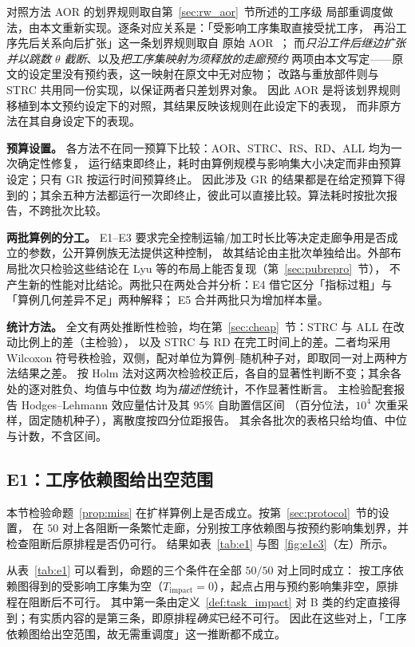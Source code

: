 \documentclass[manuscript,screen,review]{acmart}
\providecommand{\STRC}{\textsc{STRC}}
\newcommand{\NPairs}{50}
\newcommand{\PassMiss}{\NPairs/\NPairs}      %
\begin{document}
对照方法 AOR 的划界规则取自第~\ref{sec:rw_aor}~节所述的工序级
局部重调度做法，由本文重新实现。逐条对应关系是：「受影响工序集取直接受扰工序，
再沿工序先后关系向后扩张」这一条划界规则取自
原始 AOR~\cite{subramaniam2003maor}；
而\emph{只沿工件后继边扩张并以跳数 \(\theta\) 截断}、以及\emph{把工序集映射为须释放的走廊预约}
两项由本文写定——原文的设定里没有预约表，这一映射在原文中无对应物；
改路与重放部件则与 \STRC{} 共用同一份实现，以保证两者只差划界对象。
因此 AOR 是将该划界规则移植到本文预约设定下的对照，其结果反映该规则在此设定下的表现，
而非原方法在其自身设定下的表现。

\textbf{预算设置。}
各方法不在同一预算下比较：AOR、\STRC{}、RS、RD、ALL 均为一次确定性修复，
运行结束即终止，耗时由算例规模与影响集大小决定而非由预算设定；只有 GR 按运行时间预算终止。
因此涉及 GR 的结果都是在给定预算下得到的；其余五种方法都运行一次即终止，彼此可以直接比较。算法耗时按批次报告，不跨批次比较。

\textbf{两批算例的分工。}
E1--E3 要求完全控制运输/加工时长比等决定走廊争用是否成立的参数，公开算例族无法提供这种控制，
故其结论由主批次单独给出。外部布局批次只检验这些结论在 Lyu 等的布局上能否复现（第~\ref{sec:pubrepro}~节），
不产生新的性能对比结论。两批只在两处合并分析：E4 借它区分「指标过粗」与「算例几何差异不足」两种解释；
E5 合并两批只为增加样本量。

\textbf{统计方法。}
全文有两处推断性检验，均在第~\ref{sec:cheap}~节：\STRC{} 与 ALL 在改动比例上的差（主检验），
以及 \STRC{} 与 RD 在完工时间上的差。二者均采用 Wilcoxon 符号秩检验，双侧，配对单位为算例--随机种子对，即取同一对上两种方法结果之差。
按 Holm 法对这两次检验校正后，各自的显著性判断不变；其余各处的逐对胜负、均值与中位数
均为\emph{描述性}统计，不作显著性断言。
主检验配套报告 Hodges--Lehmann 效应量估计及其 \(95\%\) 自助置信区间
（百分位法，\(10^4\) 次重采样，固定随机种子），离散度按四分位距报告。
其余各批次的表格只给均值、中位与计数，不含区间。

\subsection{E1：工序依赖图给出空范围}
\label{sec:e1}

本节检验命题~\ref{prop:miss} 在扩样算例上是否成立。按第~\ref{sec:protocol}~节的设置，
在 \(\NPairs\) 对上各阻断一条繁忙走廊，分别按工序依赖图与按预约影响集划界，并检查阻断后原排程是否仍可行。
结果如表~\ref{tab:e1} 与图~\ref{fig:e1e3}（左）所示。

从表~\ref{tab:e1} 可以看到，命题的三个条件在全部 \(\PassMiss\) 对上同时成立：
按工序依赖图得到的受影响工序集为空（\(T_{\mathrm{impact}}=0\)），起点占用与预约影响集非空，原排程在阻断后不可行。
其中第一条由定义~\ref{def:task_impact} 对 B 类的约定直接得到；有实质内容的是第三条，即原排程\emph{确实}已经不可行。
因此在这些对上，「工序依赖图给出空范围，故无需重调度」这一推断都不成立。
\end{document}
